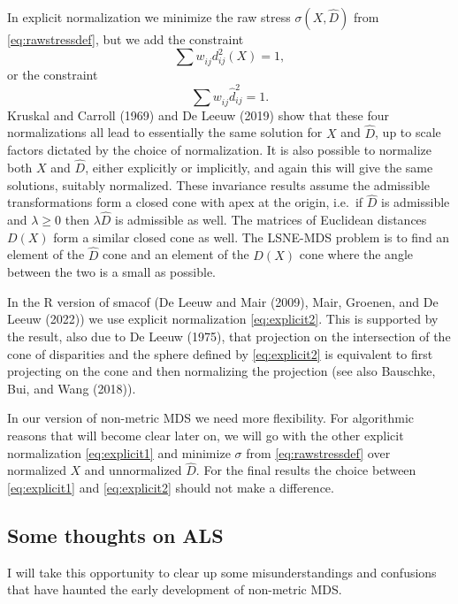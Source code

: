 \documentclass[
  12pt,
]{article}
\begin{document}
In explicit normalization we minimize the raw stress \(\sigma(X,\hat D)\)
from \eqref{eq:rawstressdef}, but we add the constraint \begin{equation}
\sum   w_{ij}^{\ }d_{ij}^2(X)=1,
\label{eq:explicit1}
\end{equation} or the constraint \begin{equation}
\sum   w_{ij}^{\ }\hat d_{ij}^2=1.
\label{eq:explicit2}
\end{equation} Kruskal and Carroll (1969) and De Leeuw (2019) show that these
four normalizations all lead to essentially the same solution for \(X\)
and \(\hat D\), up to scale factors dictated by the choice of
normalization. It is also possible to normalize both \(X\) and \(\hat D\),
either explicitly or implicitly, and again this will give the same
solutions, suitably normalized. These invariance results assume the
admissible transformations form a closed cone with apex at the origin,
i.e.~if \(\hat D\) is admissible and \(\lambda\geq 0\) then \(\lambda\hat D\)
is admissible as well. The matrices of Euclidean distances \(D(X)\) form a
similar closed cone as well. The LSNE-MDS problem is to find an element
of the \(\hat D\) cone and an element of the \(D(X)\) cone where the angle
between the two is a small as possible.

In the R version of smacof (De Leeuw and Mair (2009),
Mair, Groenen, and De Leeuw (2022)) we use explicit normalization
\eqref{eq:explicit2}. This is supported by the result, also due to
De Leeuw (1975), that projection on the intersection of the cone of
disparities and the sphere defined by \eqref{eq:explicit2} is equivalent
to first projecting on the cone and then normalizing the projection (see
also Bauschke, Bui, and Wang (2018)).

In our version of non-metric MDS we need more flexibility. For
algorithmic reasons that will become clear later on, we will go with the
other explicit normalization \eqref{eq:explicit1} and minimize \(\sigma\)
from \eqref{eq:rawstressdef} over normalized \(X\) and unnormalized
\(\hat D\). For the final results the choice between \eqref{eq:explicit1}
and \eqref{eq:explicit2} should not make a difference.

\subsection{Some thoughts on ALS}\label{some-thoughts-on-als}

I will take this opportunity to clear up some misunderstandings and
confusions that have haunted the early development of non-metric MDS.
\end{document}

